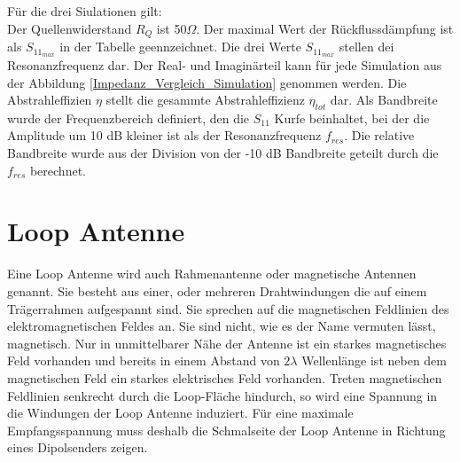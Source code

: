 Für die drei Siulationen gilt:\\
Der Quellenwiderstand $R_Q$ ist 50$\Omega$. Der maximal Wert der Rückflussdämpfung ist als $S_{11_{max}}$ in der Tabelle geennzeichnet. Die drei Werte $S_{11_{max}}$ stellen dei Resonanzfrequenz dar. Der Real- und Imaginärteil kann für jede Simulation aus der Abbildung \ref{Impedanz_Vergleich_Simulation} genommen werden. Die Abstrahleffizien $\eta$ stellt die gesammte Abstrahleffizienz $\eta_{tot}$ dar. Als Bandbreite wurde der Frequenzbereich definiert, den die $S_11$ Kurfe beinhaltet, bei der die Amplitude um 10 dB kleiner ist als der Resonanzfrequenz $f_{res}$. Die relative Bandbreite wurde aus der Division von der -10 dB Bandbreite geteilt durch die $f_{res}$ berechnet.


\newpage
\section{Loop Antenne}
Eine Loop Antenne wird  auch Rahmenantenne oder magnetische Antennen genannt. Sie besteht aus einer, oder mehreren Drahtwindungen die auf einem Trägerrahmen aufgespannt sind. Sie sprechen auf die magnetischen Feldlinien des elektromagnetischen Feldes an. Sie sind nicht, wie es der Name vermuten lässt, magnetisch. Nur in unmittelbarer Nähe der Antenne ist ein starkes magnetisches Feld vorhanden und bereits in einem Abstand von $2\lambda$ Wellenlänge ist neben dem magnetischen Feld ein starkes elektrisches Feld vorhanden. Treten magnetischen Feldlinien senkrecht durch die Loop-Fläche hindurch, so wird eine Spannung in die Windungen der Loop Antenne induziert. Für eine maximale Empfangsspannung muss deshalb die Schmalseite der Loop Antenne in Richtung eines Dipolsenders zeigen.


